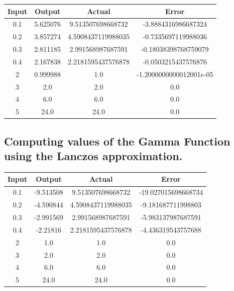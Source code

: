 \documentclass[12pt]{article}
\begin{document}
\begin{center}
	\begin{tabular}{ | c c c c | }
		\hline
		\hline
		Input & Output & Actual & Error\\
		\hline
		\hline
		0.1 & 5.625076 & 9.513507698668732 & -3.8884316986687324\\
		\hline
		0.2 & 3.857274 & 4.5908437119988035 & -0.7335697119988036\\
		\hline
		0.3 & 2.811185 & 2.991568987687591 & -0.18038398768759079\\
		\hline
		0.4 & 2.167838 & 2.2181595437576878 & -0.0503215437576876\\
		\hline
		2 & 0.999988 & 1.0 & -1.2000000000012001e-05\\
		\hline
		3 & 2.0 & 2.0 & 0.0\\
		\hline
		4 & 6.0 & 6.0 & 0.0\\
		\hline
		5 & 24.0 & 24.0 & 0.0\\
		\hline
		\hline
	\end{tabular}
\end{center}

\subsection{Computing values of the Gamma Function using the Lanczos approximation.}

\begin{center}
	\begin{tabular}{ | c c c c | }
		\hline
		\hline
		Input & Output & Actual & Error\\
		\hline
		\hline
		0.1 & -9.513508 & 9.513507698668732 & -19.027015698668734\\
		\hline
		0.2 & -4.590844 & 4.5908437119988035 & -9.181687711998803\\
		\hline
		0.3 & -2.991569 & 2.991568987687591 & -5.983137987687591\\
		\hline
		0.4 & -2.21816 & 2.2181595437576878 & -4.436319543757688\\
		\hline
		2 & 1.0 & 1.0 & 0.0\\
		\hline
		3 & 2.0 & 2.0 & 0.0\\
		\hline
		4 & 6.0 & 6.0 & 0.0\\
		\hline
		5 & 24.0 & 24.0 & 0.0\\
		\hline
		\hline
	\end{tabular}
\end{center}
\end{document}
